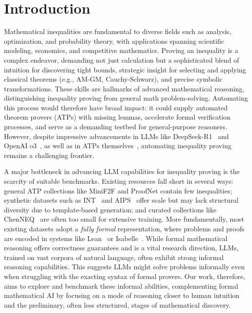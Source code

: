\vspace{-2mm}
\section{Introduction}
\label{sec:intro}
\vspace{-1mm}

Mathematical inequalities are fundamental to diverse fields such as analysis, optimization, and probability theory, with applications spanning scientific modeling, economics, and competitive mathematics. Proving an inequality is a complex endeavor, demanding not just calculation but a sophisticated blend of intuition for discovering tight bounds, strategic insight for selecting and applying classical theorems (e.g., AM-GM, Cauchy-Schwarz), and precise symbolic transformations. These skills are hallmarks of advanced mathematical reasoning, distinguishing inequality proving from general math problem-solving. Automating this process would therefore have broad impact: it could supply automated theorem provers (ATPs) with missing lemmas, accelerate formal verification processes, and serve as a demanding testbed for general-purpose reasoners. However, despite impressive advancements in LLMs like DeepSeek-R1~\cite{deepseekai2025} and OpenAI o3~\cite{openai2025o4mini}, as well as in ATPs themselves~\cite{dong2024formal, gloeckle2024abel, hu2025minictx, lin2025leanstar, poesia2024learning, ye2024reasoning}, automating inequality proving remains a challenging frontier.

A major bottleneck in advancing LLM capabilities for inequality proving is the scarcity of suitable benchmarks. Existing resources fall short in several ways: general ATP collections like MiniF2F \cite{zheng2022miniff} and ProofNet \cite{azerbayev2024proofnet} contain few inequalities; synthetic datasets such as INT~\cite{wu2021int} and AIPS~\cite{wei2024proving} offer scale but may lack structural diversity due to template-based generation; and curated collections like ChenNEQ~\cite{chen2014olympiad} are often too small for extensive training. 
More fundamentally, most existing datasets adopt a \textit{fully formal} representation, where problems and proofs are encoded in systems like Lean~\cite{Moura2015TheLT} or Isabelle~\cite{nipkow2002isabelle}. 
While formal mathematical reasoning offers correctness guarantees and is a vital research direction, LLMs, trained on vast corpora of natural language, often exhibit strong informal reasoning capabilities. This suggests LLMs might solve problems informally even when struggling with the exacting syntax of formal provers. Our work, therefore, aims to explore and benchmark these informal abilities, complementing formal mathematical AI by focusing on a mode of reasoning closer to human intuition and the preliminary, often less structured, stages of mathematical discovery.

